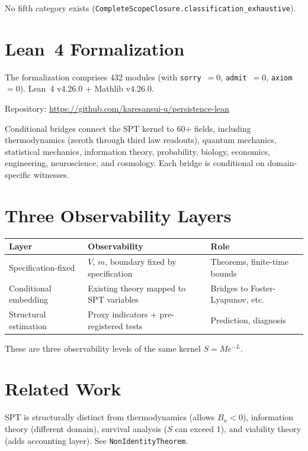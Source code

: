 \documentclass[11pt,a4paper]{article}
\begin{document}
No fifth category exists (\texttt{CompleteScopeClosure.classification\_exhaustive}).

\section{Lean~4 Formalization}
\label{sec:lean}

The formalization comprises 432 modules (with \texttt{sorry}~$=0$, \texttt{admit}~$=0$, \texttt{axiom}~$=0$). Lean~4 v4.26.0 + Mathlib v4.26.0.

Repository: \url{https://github.com/karesansui-u/persistence-lean}

Conditional bridges connect the SPT kernel to 60+ fields, including thermodynamics (zeroth through third law readouts), quantum mechanics, statistical mechanics, information theory, probability, biology, economics, engineering, neuroscience, and cosmology. Each bridge is conditional on domain-specific witnesses.

\section{Three Observability Layers}

\begin{center}
\begin{tabular}{lp{4.5cm}p{5cm}}
\toprule
Layer & Observability & Role \\
\midrule
Specification-fixed & $V$, $m$, boundary fixed by specification & Theorems, finite-time bounds \\
Conditional embedding & Existing theory mapped to SPT variables & Bridges to Foster-Lyapunov, etc. \\
Structural estimation & Proxy indicators + pre-registered tests & Prediction, diagnosis \\
\bottomrule
\end{tabular}
\end{center}

These are three observability levels of the same kernel $S=Me^{-L}$.

\section{Related Work}

SPT is structurally distinct from thermodynamics (allows $B_n<0$), information theory (different domain), survival analysis ($S$ can exceed 1), and viability theory (adds accounting layer). See \texttt{NonIdentityTheorem}.
\end{document}
